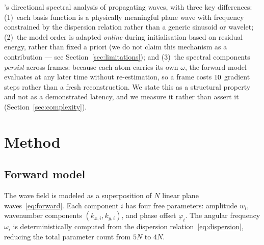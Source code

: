 \documentclass[review]{elsarticle}
\begin{document}
\citet{donelan1996}'s directional spectral analysis of propagating
waves, with three key differences: (1)~each basis function is a
physically meaningful plane wave with frequency constrained by the
dispersion relation rather than a generic sinusoid or wavelet;
(2)~the model order is adapted \emph{online} during initialisation based
on residual energy, rather than fixed a priori
(we do not claim this mechanism as a contribution --- see
Section~\ref{sec:limitations}); and
(3)~the spectral components \emph{persist} across frames: because each atom carries
its own $\omega$, the forward model evaluates at any later time without
re-estimation, so a frame costs $10{}$ gradient steps rather than a
fresh reconstruction. We state this as a structural property and not as a
demonstrated latency, and we measure it rather than assert it
(Section~\ref{sec:complexity}).

\section{Method}
\label{sec:method}

\subsection{Forward model}

The wave field is modeled as a superposition of $N$ linear plane
waves~\eqref{eq:forward}.
Each component $i$ has four free parameters: amplitude $w_i$,
wavenumber components $(k_{x,i}, k_{y,i})$, and phase offset
$\varphi_i$. The angular frequency $\omega_i$ is deterministically
computed from the dispersion relation~\eqref{eq:dispersion},
reducing the total parameter count from $5N$ to $4N$.
\end{document}
